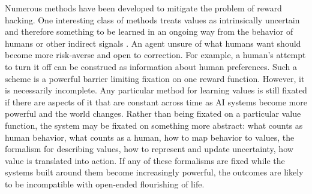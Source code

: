 \documentclass[11pt]{article}
\begin{document}
Numerous methods have been developed to mitigate the problem of reward hacking. One interesting class of methods treats values as intrinsically uncertain and therefore something to be learned in an ongoing way from the behavior of humans or other indirect signals \citep{russell2019human, hadfieldmenell2017off, shah2020benefits, hadfieldmenell2016cooperative, jeon2020reward}. An agent unsure of what humans want should become more risk-averse and open to correction. For example, a human's attempt to turn it off can be construed as information about human preferences. Such a scheme is a powerful barrier limiting fixation on one reward function. However, it is necessarily incomplete. Any particular method for learning values is still fixated if there are aspects of it that are constant across time as AI systems become more powerful and the world changes. Rather than being fixated on a particular value function, the system may be fixated on something more abstract: what counts as human behavior, what counts as a human, how to map behavior to values, the formalism for describing values, how to represent and update uncertainty, how value is translated into action. If any of these formalisms are fixed while the systems built around them become increasingly powerful, the outcomes are likely to be incompatible with open-ended flourishing of life.








\end{document}

